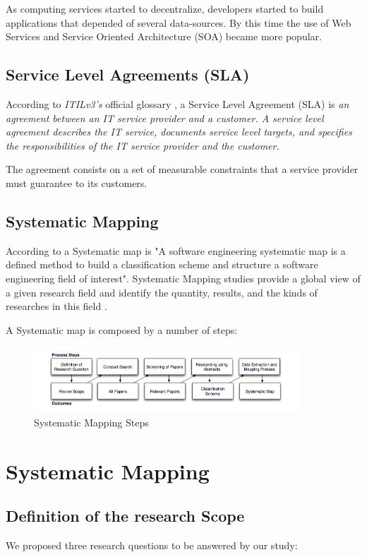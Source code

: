 \documentclass{article}
\begin{document}
As computing services started to decentralize, developers started to build applications that depended of several data-sources. By this time the use of Web Services and Service Oriented Architecture (SOA) became more popular. 



\subsection{Service Level Agreements (SLA)}
According to \textit{ITILv3's} official glossary \cite{itilv3glossary}, a Service Level Agreement (SLA) is \textit{an agreement between an IT service provider and a customer.  A service level agreement describes the IT service, documents service level targets, and specifies the responsibilities of the IT service provider and the customer.} 

The agreement consists on a set of measurable constraints that a service provider must guarantee to its customers.

\subsection{Systematic Mapping}
According to \cite{Petersen:2008:SMS:2227115.2227123} a Systematic map is "A software engineering systematic map is a defined method to build a classification scheme and structure a software engineering field of interest". Systematic Mapping studies provide a global view of a given research field and identify the quantity, results, and the kinds of researches in this field \cite{Petersen:2008}.

A Systematic map is composed by a number of steps:
\begin{figure}[ht!]
\centering
\includegraphics[width=100mm]{pic1.png}
\caption{Systematic Mapping Steps \label{overflow}}
\end{figure}



\section{Systematic Mapping}

\subsection{Definition of the research Scope}
We proposed three research questions to be answered by our study: 
\end{document}
